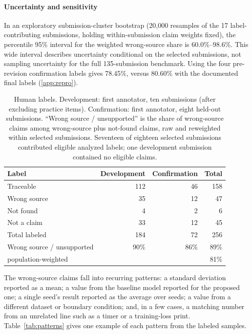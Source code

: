 \documentclass[preprint,12pt,authoryear]{elsarticle}
\begin{document}
\paragraph{Uncertainty and sensitivity} In an exploratory submission-cluster bootstrap (20,000 resamples of the 17 label-contributing submissions, holding within-submission claim weights fixed), the percentile 95\% interval for the weighted wrong-source share is 60.0\%--98.6\%. This wide interval describes uncertainty conditional on the selected submissions, not sampling uncertainty for the full 135-submission benchmark. Using the four pre-revision confirmation labels gives 78.45\%, versus 80.60\% with the documented final labels (\ref{app:repro}).

\begin{table}[t]
\centering
\caption{Human labels. Development: first annotator, ten submissions (after excluding practice items). Confirmation: first annotator, eight held-out submissions. ``Wrong source / unsupported'' is the share of wrong-source claims among wrong-source plus not-found claims, raw and reweighted within selected submissions. Seventeen of eighteen selected submissions contributed eligible analyzed labels; one development submission contained no eligible claims.}
\label{tab:labels}
\footnotesize
\begin{tabular}{@{}lrrr@{}}
\toprule
Label & Development & Confirmation & Total\\
\midrule
Traceable & 112 & 46 & 158\\
Wrong source & 35 & 12 & 47\\
Not found & 4 & 2 & 6\\
Not a claim & 33 & 12 & 45\\
\midrule
Total labeled & 184 & 72 & 256\\
Wrong source / unsupported & 90\% & 86\% & 89\%\\
\quad population-weighted & & & 81\%\\
\bottomrule
\end{tabular}
\end{table}

The wrong-source claims fall into recurring patterns: a standard deviation reported as a mean; a value from the baseline model reported for the proposed one; a single seed's result reported as the average over seeds; a value from a different dataset or boundary condition; and, in a few cases, a matching number from an unrelated line such as a timer or a training-loss print. Table~\ref{tab:patterns} gives one example of each pattern from the labeled samples.
\end{document}
